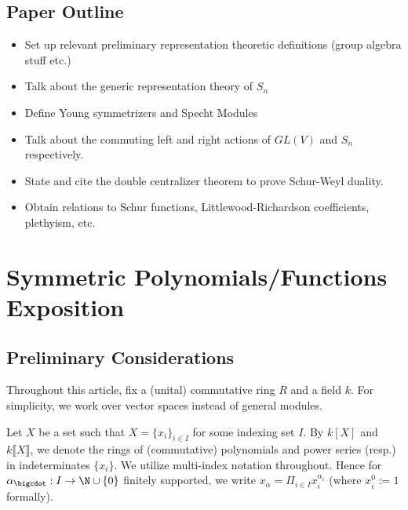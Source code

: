 \documentclass[12pt]{article}
\begin{document}
\subsection{Paper Outline}


\begin{itemize}
  \item Set up relevant preliminary representation theoretic definitions (group algebra stuff etc.)
  \item Talk about the generic representation theory of $ S_{n} $ 
  \item Define Young symmetrizers and Specht Modules 
  \item Talk about the commuting left and right actions of $ GL(V) $ and $ S_{n} $ respectively.
  \item State and cite the double centralizer theorem to prove Schur-Weyl duality. 
  \item Obtain relations to Schur functions, Littlewood-Richardson coefficients, plethyism, etc.
\end{itemize}


\newpage

\section{Symmetric Polynomials/Functions Exposition}


\subsection*{Preliminary Considerations} 
Throughout this article, fix a (unital) commutative ring $ R $ and a field $ k $. For simplicity, we work over vector spaces instead of general modules.

\begin{notation*}
  Let $ X $ be a set such that $ X = \{x_{i}\}_{i\in I} $ for some indexing set $ I $. By $ k[X] $ and $ k\llbracket X \rrbracket $, we denote the rings of (commutative) polynomials and power series (resp.) in indeterminates $ \{x_{i}\} $. We utilize multi-index notation throughout. Hence for $ \alpha_{\bigcdot}:I\to \N\cup\{0\} $ finitely supported, we write $ x_{\alpha} = \Pi_{i\in I}x_{i}^{\alpha_{i}} $ (where $ x_{i}^0 := 1 $ formally).
\end{notation*}
\end{document}
